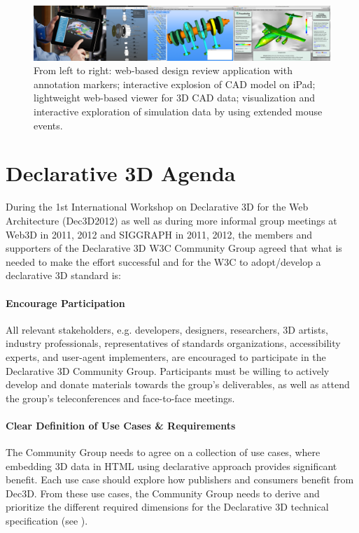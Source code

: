 \documentclass[review]{acmsiggraph}
\begin{document}
\begin{figure}
  \centering
  \includegraphics[width=1.0\textwidth]{images/cad_apps.png}
  \caption{From left to right: web-based design review application with annotation markers; interactive explosion of CAD model on iPad; lightweight web-based viewer for 3D CAD data; visualization and interactive exploration of simulation data by using extended mouse events.}
  \vspace{-0.2cm}
\end{figure}


\section{Declarative 3D Agenda}

\label{sec:Agenda}
During the 1st International Workshop on Declarative 3D for the Web Architecture (Dec3D2012) \cite{Dec3D2012} as well as during more informal group meetings at Web3D in 2011, 2012 and SIGGRAPH in 2011, 2012, the members and supporters of the Declarative 3D W3C Community Group agreed that what is needed to make the effort successful and for the W3C to adopt/develop a declarative 3D standard is:

\paragraph{Encourage Participation}
All relevant stakeholders, e.g. developers, designers, researchers, 3D artists, industry professionals, representatives of standards organizations, accessibility experts, and user-agent implementers, are encouraged to participate in the Declarative 3D Community Group. Participants must be willing to actively develop and donate materials towards the group's deliverables, as well as attend the group's teleconferences and face-to-face meetings.

\paragraph{Clear Definition of Use Cases \& Requirements}
The Community Group needs to agree on a collection of use cases, where embedding 3D data in HTML using declarative approach provides significant benefit. Each use case should explore how publishers and consumers benefit from Dec3D. From these use cases, the Community Group needs to derive and prioritize the different required dimensions for the Declarative 3D technical specification (see \cite{JankowskiDec3D2012,LeFeuvreDec3D2012}).
\end{document}
